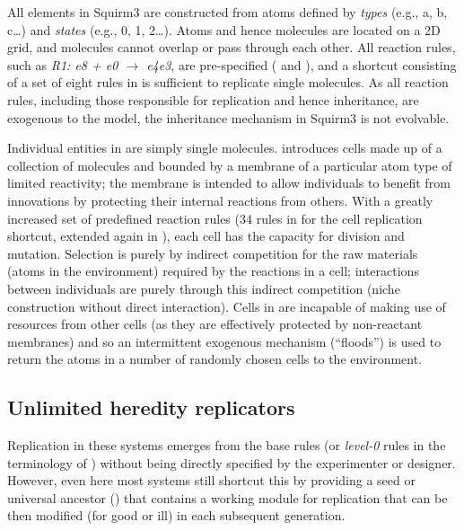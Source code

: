 All elements in Squirm3 are constructed from atoms defined by \emph{types} (e.g., a, b, c\dots) and \emph{states} (e.g., 0, 1, 2\dots). Atoms and hence molecules are located on a 2D grid, and molecules cannot overlap or pass through each other. All reaction rules, such as \emph{R1: e8 + e0 $\rightarrow$ e4e3}, are pre-specified (\textcite[p.4]{Hutton2007} and \textcite[p.49]{Faulconbridge2011}), and a shortcut consisting of a set of eight rules in \textcite{Hutton2002} is sufficient to replicate single molecules. As all reaction rules, including those responsible for replication and hence inheritance, are exogenous to the model, the inheritance mechanism in Squirm3 is not evolvable. 

Individual entities in \textcite{Hutton2002} are simply single molecules. \Textcite{Hutton2007} introduces cells made up of a collection of molecules and bounded by a membrane of a particular atom type of limited reactivity; the membrane is intended to allow individuals to benefit from innovations by protecting their internal reactions from others. With a greatly increased set of predefined reaction rules (34 rules in \textcite{Hutton2007} for the cell replication shortcut, extended again in \textcite{Lucht2012}), each cell has the capacity for division and mutation.  Selection is purely by indirect competition for the raw materials (atoms in the environment) required by the reactions in a cell; interactions between individuals are purely through this indirect competition (niche construction without direct interaction). Cells in \textcite{Hutton2007} are incapable of making use of resources from other cells (as they are effectively protected by non-reactant membranes) and so an intermittent exogenous mechanism (``floods'') is used to return the atoms in a number of randomly chosen cells to the environment.

\subsection{Unlimited heredity replicators}
Replication in these systems emerges from the base rules (or \textit{level-0} rules in the terminology of \textcite{BanzhafBaumgaertnerBeslonEtAl2016}) without being directly specified by the experimenter or designer. However, even here most systems still shortcut this by providing a seed or universal ancestor (\eg \textcite{Ofria2004}) that contains a working module for replication that can be then modified (for good or ill) in each subsequent generation.

